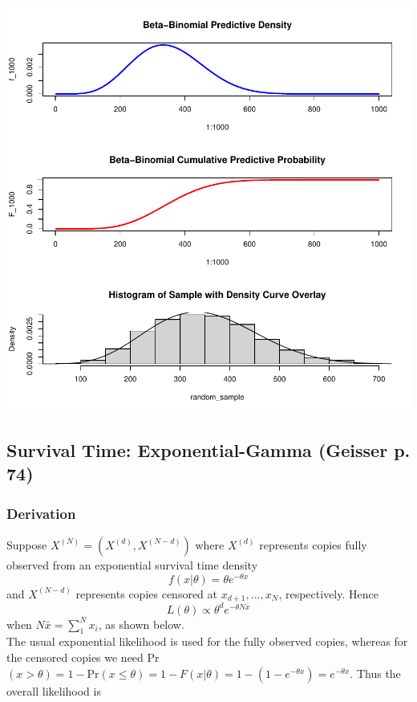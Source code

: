 \documentclass[12pt, a4paper]{article}
\begin{document}
\includegraphics{Thesis_Outline-002}



    \subsection{Survival Time:  Exponential-Gamma (Geisser p. 74)}


    \subsubsection{Derivation}

      Suppose $X^{(N)} = \left(X^{(d)},X^{(N-d)}\right)$ where $X^{(d)}$ represents copies fully observed from an exponential survival time density
          $$f(x|\theta) = \theta e^{-\theta x}$$
      and $X^{(N-d)}$ represents copies censored at $x_{d+1},...,x_N$, respectively.  Hence
          $$L(\theta)\propto\theta^d e^{-\theta N\bar{x}}$$
      when $N\bar{x} = \sum_1^N{x_i}$, as shown below.\\

      The usual exponential likelihood is used for the fully observed copies, whereas for the censored copies we need Pr$(x > \theta) = 1 - \text{Pr}(x\leq\theta) = 1 - F(x|\theta) = 1 - (1 - e^{-\theta x}) = e^{-\theta x}$.  Thus the overall likelihood is
\end{document}
